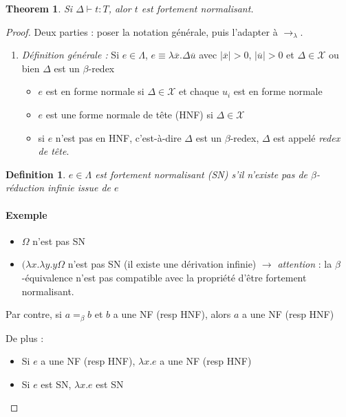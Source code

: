 \documentclass{article}
\newtheorem{thm}{Theorem}
\newtheorem{defi}{Definition}
\newcommand\lterm[2]{\lambda #1. #2}
\begin{document}
\begin{thm}
Si $\Delta \vdash t : T$, alor $t$ est fortement normalisant.
\end{thm}

\begin{proof}
Deux parties : poser la notation générale, puis l'adapter à $\to_\lambda$.

\begin{enumerate}
\item \emph{Définition générale :} Si $e \in \Lambda$, $e\equiv \lterm{\overline{x}}{\Delta \overline{u}}$ avec $|\overline{x}|>0$, $|\overline{u}|>0$ et $\Delta \in \mathcal{X}$ ou bien $\Delta$ est un $\beta$-redex
\begin{itemize}
\item $e$ est en forme normale si $\Delta \in \mathcal{X}$ et chaque $u_i$ est en forme normale
\item $e$ est une forme normale de tête (HNF) si $\Delta \in \mathcal{X}$
\item si $e$ n'est pas en HNF, c'est-à-dire $\Delta$ est un $\beta$-redex, $\Delta$ est appelé \emph{redex de tête}.
\end{itemize}
\end{enumerate}

\begin{defi}
$e \in \Lambda$ est fortement normalisant (SN) s'il n'existe pas de $\beta$-réduction infinie issue de $e$
\end{defi}

\paragraph{Exemple}
\begin{itemize}
\item $\Omega$ n'est pas SN
\item $(\lterm{x}{\lterm{y}{y}} \Omega$ n'est pas SN (il existe une dérivation infinie) $\to$ \emph{attention} : la $\beta$-équivalence n'est pas compatible avec la propriété d'être fortement normalisant.
\end{itemize}

Par contre, si $a=_\beta b$ et $b$ a une NF (resp HNF), alors $a$ a une NF (resp HNF)

De plus :
\begin{itemize}
\item Si $e$ a une NF (resp HNF), $\lterm{x}{e}$ a une NF (resp HNF)
\item Si $e$ est SN, $\lterm{x}{e}$ est SN
\end{itemize}
\bigskip


\end{proof}
\end{document}
